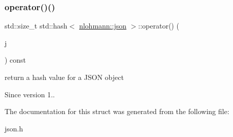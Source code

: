 \subsubsection{\texorpdfstring{operator()()}{operator()()}}
{\footnotesize\ttfamily std\+::size\+\_\+t std\+::hash$<$ \hyperlink{namespacenlohmann_a2bfd99e845a2e5cd90aeaf1b1431f474}{nlohmann\+::json} $>$\+::operator() (\begin{DoxyParamCaption}\item[{const \hyperlink{namespacenlohmann_a2bfd99e845a2e5cd90aeaf1b1431f474}{nlohmann\+::json} \&}]{j }\end{DoxyParamCaption}) const\hspace{0.3cm}{\ttfamily [inline]}}



return a hash value for a J\+S\+ON object 

\begin{DoxySince}{Since}
version 1.. 
\end{DoxySince}


The documentation for this struct was generated from the following file\+:\begin{DoxyCompactItemize}
\item 
json.\+h\end{DoxyCompactItemize}
